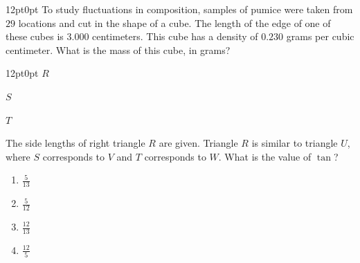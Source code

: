 \documentclass[11pt, twocolumn]{article}
\newcounter{questionnum}
\begin{document}
\vspace{6pt}\noindent
\begin{minipage}{\columnwidth}\raggedright
\noindent{}\par\vspace{8pt}
\begin{adjustwidth}{12pt}{0pt}
To study fluctuations in composition, samples of pumice were taken from $29$ locations and cut in the shape of a cube. The length of the edge of one of these cubes is $3.000$ centimeters. This cube has a density of $0.230$ grams per cubic centimeter. What is the mass of this cube, in grams?
\end{adjustwidth}
\end{minipage}\par

\vspace{6pt}\noindent
\begin{minipage}{\columnwidth}\raggedright
\noindent{}\par\vspace{8pt}
\begin{adjustwidth}{12pt}{0pt}
$R$

$S$

$T$

The side lengths of right triangle $R$ are given. Triangle $R$ is similar to triangle $U$, where $S$ corresponds to $V$ and $T$ corresponds to $W$. What is the value of $\tan$?
\begin{enumerate}[label=\Alph*),leftmargin=18pt,topsep=3pt,itemsep=2pt]
  \item $\frac{5}{13}$
  \item $\frac{5}{12}$
  \item $\frac{12}{13}$
  \item $\frac{12}{5}$
\end{enumerate}
\end{adjustwidth}
\end{minipage}\par
\end{document}
